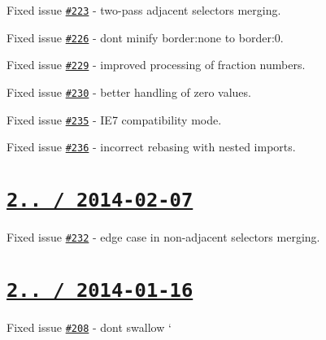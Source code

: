 \begin{DoxyItemize}
\item Fixed issue \href{https://github.com/jakubpawlowicz/clean-css/issues/223}{\tt \#223} -\/ two-\/pass adjacent selectors merging.
\item Fixed issue \href{https://github.com/jakubpawlowicz/clean-css/issues/226}{\tt \#226} -\/ don\textquotesingle{}t minify {\ttfamily border\+:none} to {\ttfamily border\+:0}.
\item Fixed issue \href{https://github.com/jakubpawlowicz/clean-css/issues/229}{\tt \#229} -\/ improved processing of fraction numbers.
\item Fixed issue \href{https://github.com/jakubpawlowicz/clean-css/issues/230}{\tt \#230} -\/ better handling of zero values.
\item Fixed issue \href{https://github.com/jakubpawlowicz/clean-css/issues/235}{\tt \#235} -\/ I\+E7 compatibility mode.
\item Fixed issue \href{https://github.com/jakubpawlowicz/clean-css/issues/236}{\tt \#236} -\/ incorrect rebasing with nested {\ttfamily import}s.
\end{DoxyItemize}

\section*{\href{https://github.com/jakubpawlowicz/clean-css/compare/v2.0.7...v2.0.8}{\tt 2.. / 2014-\/02-\/07} }


\begin{DoxyItemize}
\item Fixed issue \href{https://github.com/jakubpawlowicz/clean-css/issues/232}{\tt \#232} -\/ edge case in non-\/adjacent selectors merging.
\end{DoxyItemize}

\section*{\href{https://github.com/jakubpawlowicz/clean-css/compare/v2.0.6...v2.0.7}{\tt 2.. / 2014-\/01-\/16} }


\begin{DoxyItemize}
\item Fixed issue \href{https://github.com/jakubpawlowicz/clean-css/issues/208}{\tt \#208} -\/ don\textquotesingle{}t swallow ` 
\end{DoxyItemize}